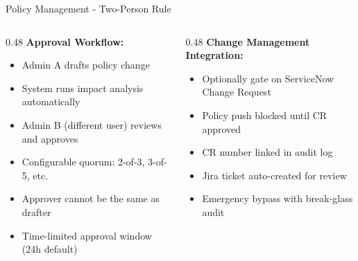 \begin{frame}{Policy Management - Two-Person Rule}
  \scriptsize
  \begin{columns}[T]
    \begin{column}{0.48\textwidth}
      \textbf{Approval Workflow:}
      \begin{itemize}
        \setlength{\itemsep}{0pt}
        \item Admin A drafts policy change
        \item System runs impact analysis automatically
        \item Admin B (different user) reviews and approves
        \item Configurable quorum: 2-of-3, 3-of-5, etc.
        \item Approver cannot be the same as drafter
        \item Time-limited approval window (24h default)
      \end{itemize}
    \end{column}
    \begin{column}{0.48\textwidth}
      \textbf{Change Management Integration:}
      \begin{itemize}
        \setlength{\itemsep}{0pt}
        \item Optionally gate on ServiceNow Change Request
        \item Policy push blocked until CR approved
        \item CR number linked in audit log
        \item Jira ticket auto-created for review
        \item Emergency bypass with break-glass audit
      \end{itemize}
    \end{column}
  \end{columns}
\end{frame}
